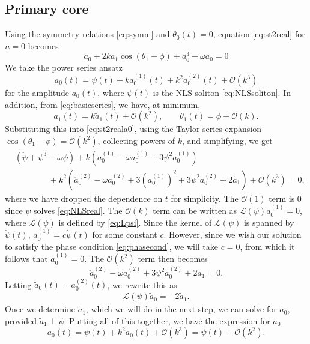\documentclass[11pt,reqno]{amsart}
\def\calL{{\mathcal L}}
\begin{document}
\subsection{Primary core}

Using the symmetry relations \cref{eq:symm} and $\theta_0(t) = 0$, equation \cref{eq:st2real} for $n=0$ becomes
\begin{equation}\label{eq:st2reala0}
\ddot a_0  + 2 k a_1 \cos(\theta_1 - \phi) + a_0^3 - \omega a_0 = 0 
\end{equation}
We take the power series ansatz 
\[
a_0(t) = \psi(t) + k a_0^{(1)}(t) + k^2 a_0^{(2)}(t) + \mathcal{O}(k^3)
\]
for the amplitude $a_0(t)$, where $\psi(t)$ is the NLS soliton \cref{eq:NLSsoliton}. In addition, from \cref{eq:basicseries}, we have, at minimum, 
\[
a_1(t) = k \tilde{a}_1(t) + \mathcal{O}(k^2), \qquad \theta_1(t) = \phi + \mathcal{O}(k).
\]
Substituting this into \cref{eq:st2reala0}, using the Taylor series expansion $\cos(\theta_1-\phi) = \mathcal{O}(k^2)$, collecting powers of $k$, and simplifying, we get
\begin{equation*}
\begin{aligned}
&\left(\ddot{\psi} + \psi^3 - \omega \psi\right) 
+ k\left(\ddot a_0^{(1)} - \omega a_0^{(1)} + 3 \psi^2 a_0^{(1)}\right) \\
&\qquad\qquad+ k^2\left(\ddot a_0^{(2)} - \omega a_0^{(2)} + 3\left(a_0^{(1)}\right)^2 + 3 \psi^2 a_0^{(2)} + 2 \tilde{a}_1 \right) + \mathcal{O}(k^3) = 0,
\end{aligned}
\end{equation*}
where we have dropped the dependence on $t$ for simplicity. The $\mathcal{O}(1)$ term is 0 since $\psi$ solves \cref{eq:NLSreal}. The $\mathcal{O}(k)$ term can be written as $\calL(\psi)a_0^{(1)}=0$, where $\calL(\psi)$ is defined by \cref{eq:Lpsi}. Since the kernel of $\calL(\psi)$ is spanned by $\dot \psi(t)$, $a_0^{(1)} = c \dot \psi(t)$ for some constant $c$. However, since we wish our solution to satisfy the phase condition \cref{eq:phasecond}, we will take $c = 0$, from which it follows that $a_0^{(1)} = 0$. The $\mathcal{O}(k^2)$ term then becomes
\[
\ddot a_0^{(2)} - \omega a_0^{(2)} + 3 \psi^2 a_0^{(2)} + 2 \tilde{a}_1 = 0.
\]
Letting $\tilde{a}_0(t) = a_0^{(2)}(t)$, we rewrite this as
\begin{align}\label{eq:solvea0ta}
\calL(\psi) \tilde{a}_0 = -2 \tilde{a}_1.
\end{align}
Once we determine $\tilde{a}_1$, which we will do in the next step, we can solve for $\tilde{a}_0$, provided $\tilde{a}_1 \perp \dot\psi$. Putting all of this together, we have the expression for $a_0$
\begin{equation}\label{eq:a0eq}
a_0(t) = \psi(t) + k^2 \tilde{a}_0(t) + \mathcal{O}(k^3) = \psi(t) + \mathcal{O}(k^2).
\end{equation}
\end{document}
